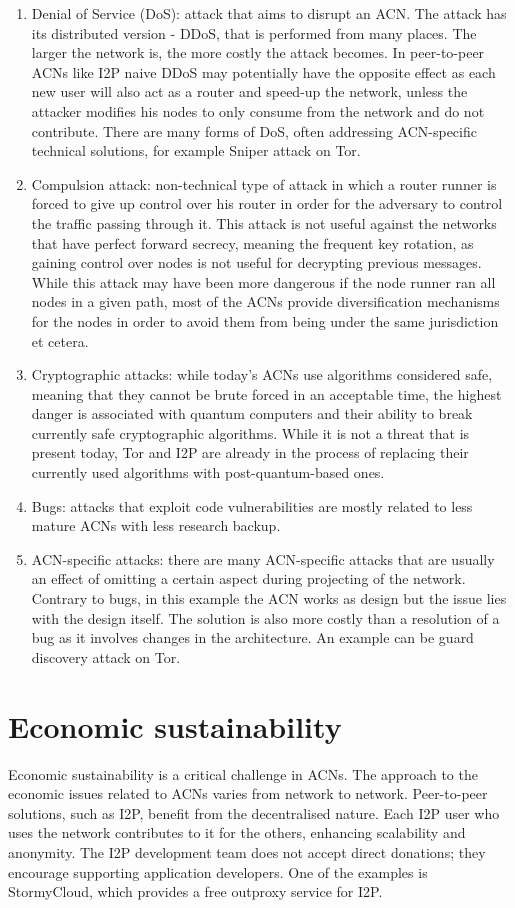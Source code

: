 \begin{enumerate}
    \item Denial of Service (DoS): attack that aims to disrupt an ACN. The attack has its distributed version - DDoS, that is performed from many places. The larger the network is, the more costly the attack becomes. In peer-to-peer ACNs like I2P naive DDoS may potentially have the opposite effect as each new user will also act as a router and speed-up the network, unless the attacker modifies his nodes to only consume from the network and do not contribute. There are many forms of DoS, often addressing ACN-specific technical solutions, for example Sniper attack \cite{sniper} on Tor.
    \item Compulsion attack: non-technical type of attack in which a router runner is forced to give up control over his router in order for the adversary to control the traffic passing through it. This attack is not useful against the networks that have perfect forward secrecy, meaning the frequent key rotation, as gaining control over nodes is not useful for decrypting previous messages. While this attack may have been more dangerous if the node runner ran all nodes in a given path, most of the ACNs provide diversification mechanisms for the nodes in order to avoid them from being under the same jurisdiction et cetera.
    \item Cryptographic attacks: while today's ACNs use algorithms considered safe, meaning that they cannot be brute forced in an acceptable time, the highest danger is associated with quantum computers and their ability to break currently safe cryptographic algorithms. While it is not a threat that is present today, Tor and I2P are already in the process of replacing their currently used algorithms with post-quantum-based ones.
    \item Bugs: attacks that exploit code vulnerabilities are mostly related to less mature ACNs with less research backup.
    \item ACN-specific attacks: there are many ACN-specific attacks that are usually an effect of omitting a certain aspect during projecting of the network. Contrary to bugs, in this example the ACN works as design but the issue lies with the design itself. The solution is also more costly than a resolution of a bug as it involves changes in the architecture. An example can be guard discovery attack \cite{guard-discovery} on Tor.
\end{enumerate}

\section{Economic sustainability}
Economic sustainability is a critical challenge in ACNs. The approach to the economic issues related to ACNs varies from network to network. Peer-to-peer solutions, such as I2P, benefit from the decentralised nature. Each I2P user who uses the network contributes to it for the others, enhancing scalability and anonymity. The I2P development team does not accept direct donations; they encourage supporting application developers. One of the examples is StormyCloud, which provides a free outproxy service for I2P.

